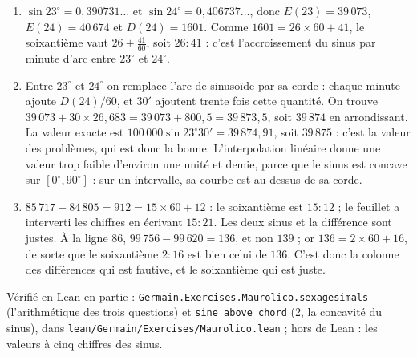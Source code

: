 \documentclass[11pt,a4paper]{article}
\begin{document}
\begin{solution}
\begin{enumerate}
\item $\sin 23^\circ = 0{,}390731\ldots$ et $\sin 24^\circ = 0{,}406737\ldots$,
  donc $E(23) = 39\,073$, $E(24) = 40\,674$ et $D(24) = 1601$. Comme
  $1601 = 26 \times 60 + 41$, le soixantième vaut $26 + \frac{41}{60}$, soit
  $26{:}41$ : c'est l'accroissement du sinus par minute d'arc entre $23^\circ$ et
  $24^\circ$.
\item Entre $23^\circ$ et $24^\circ$ on remplace l'arc de sinusoïde par sa corde :
  chaque minute ajoute $D(24)/60$, et $30'$ ajoutent trente fois cette quantité.
  On trouve $39\,073 + 30 \times 26{,}683 = 39\,073 + 800{,}5 = 39\,873{,}5$,
  soit $39\,874$ en arrondissant. La valeur exacte est
  $100\,000 \sin 23^\circ 30' = 39\,874{,}91$, soit $39\,875$ : c'est la valeur
  des problèmes, qui est donc la bonne. L'interpolation linéaire donne une
  valeur trop faible d'environ une unité et demie, parce que le sinus est
  concave sur $[0^\circ, 90^\circ]$ : sur un intervalle, sa courbe est au-dessus
  de sa corde.
\item $85\,717 - 84\,805 = 912 = 15 \times 60 + 12$ : le soixantième est
  $15{:}12$ ; le feuillet a interverti les chiffres en écrivant $15{:}21$. Les
  deux sinus et la différence sont justes. À la ligne 86,
  $99\,756 - 99\,620 = 136$, et non $139$ ; or $136 = 2 \times 60 + 16$, de sorte
  que le soixantième $2{:}16$ est bien celui de $136$. C'est donc la colonne des
  différences qui est fautive, et le soixantième qui est juste.
\end{enumerate}

Vérifié en Lean en partie : \texttt{Germain.Exercises.Maurolico.sexagesimals} (l'arithmétique
des trois questions) et \texttt{sine\_above\_chord} (2, la concavité du sinus), dans
\texttt{lean/Germain/Exercises/Maurolico.lean} ; hors de Lean : les valeurs à cinq chiffres des sinus.
\end{solution}
\end{document}
